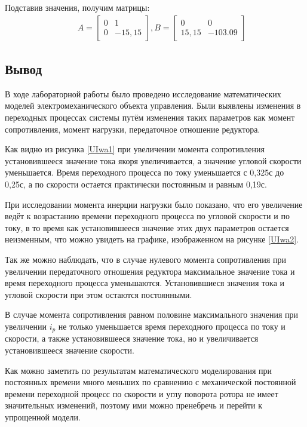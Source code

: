 \documentclass[a4paper,12pt]{article} %
\begin{document}
Подставив значения, получим матрицы:
\begin{align}
	&&A =
	\begin{bmatrix}
		0 & 1\\
		0 & -15,15
	\end{bmatrix}, B = 
	\begin{bmatrix}
		0 & 0\\
		15,15 & -103.09
	\end{bmatrix}
\end{align}

\newpage
\begin{center}
	\section*{Вывод}
\end{center}
\par
В ходе лабораторной работы было проведено исследование математических моделей электромеханического объекта управления. Были выявлены изменения в переходных процессах системы путём изменения таких параметров как момент сопротивления, момент нагрузки, передаточное отношение редуктора.\par
Как видно из рисунка \ref{UIwa1} при увеличении момента сопротивления установившееся значение тока якоря увеличивается, а значение угловой скорости уменьшается. Время переходного процесса по току уменьшается с 0,325с до 0,25с, а по скорости остается практически постоянным и равным 0,19с.\par
При исследовании момента инерции нагрузки было показано, что его увеличение ведёт к возрастанию времени переходного процесса по угловой скорости и по току, в то время как установившееся значение этих двух параметров остается неизменным, что можно увидеть на графике, изображенном на рисунке \ref{UIwa2}.\par
Так же можно наблюдать, что в случае нулевого момента сопротивления при увеличении передаточного отношения редуктора максимальное значение тока и время переходного процесса уменьшаются. Установившиеся значения тока и угловой скорости при этом остаются постоянными.\par
В случае момента сопротивления равном половине максимального значения при увеличении $i_p$ не только уменьшается время переходного процесса по току и скорости, а также установившееся значение тока, но и увеличивается установившееся значение скорости.\par
Как можно заметить по результатам математического моделирования при постоянных времени много меньших по сравнению с механической постоянной времени переходной процесс по скорости и углу поворота ротора не имеет значительных изменений, поэтому ими можно пренебречь и перейти к упрощенной модели.
\end{document}
